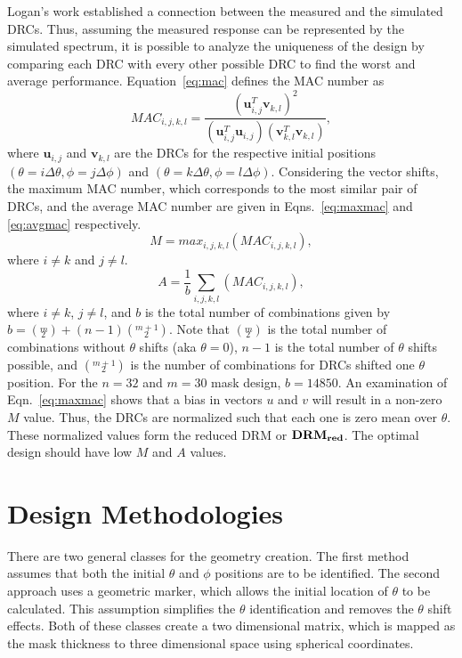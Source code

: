 \documentclass[3p,times]{elsarticle}
\begin{document}
Logan's work established a connection between the measured and the simulated DRCs.  Thus, assuming the measured response can be represented by the simulated spectrum,
it is possible to analyze the uniqueness of the design by comparing each DRC with every other possible DRC to find the worst and average performance.  Equation~\ref{eq:mac} defines the MAC number as
\begin{equation}
MAC_{i,j,k,l}=\frac{\left(\mathbf{u}_{i,j}^T\mathbf{v}_{k,l}\right)^2}{\left(\mathbf{u}_{i,j}^T\mathbf{u}_{i,j}\right)\left(\mathbf{v}_{k,l}^T\mathbf{v}_{k,l}\right)},
\label{eq:mac}
\end{equation}
where $\mathbf{u}_{i,j}$ and $\mathbf{v}_{k,l}$ are the DRCs for the respective initial positions $\left(\theta=i\Delta\theta,\phi=j\Delta\phi\right)$ and
$\left(\theta=k\Delta\theta,\phi=l\Delta\phi\right)$.
Considering the vector shifts, the maximum MAC number, which corresponds to the most similar pair of DRCs, and the average MAC number are given in 
Eqns.~\ref{eq:maxmac} and \ref{eq:avgmac} respectively.
\begin{equation}
M=max_{i,j,k,l}\left(MAC_{i,j,k,l}\right),
\label{eq:maxmac}
\end{equation}
where $i\neq k$ and $j\neq l$.
\begin{equation}
A=\frac{1}{b}\sum_{i,j,k,l}\left(MAC_{i,j,k,l}\right),
\label{eq:avgmac}
\end{equation}
where $i\neq k$, $j\neq l$, and $b$ is the total number of combinations given by $b=\left(\overset{m}{_2}\right)+(n-1)\left(\overset{m+1}{_2}\right)$.  
Note that $\left(\overset{m}{_2}\right)$ is the total number of combinations
without $\theta$ shifts (aka $\theta=0$), $n-1$ is the total number of $\theta$ shifts possible, and $\left(\overset{m+1}{_2}\right)$ is the number of combinations for DRCs shifted one $\theta$ 
position.  For the $n=32$ and
$m=30$ mask design, $b=14850$.  An examination of Eqn.~\ref{eq:maxmac} shows that a bias in vectors $u$ and $v$ will result in a non-zero $M$ value.  Thus, the DRCs are normalized such that each one is 
zero mean over $\theta$.  These normalized values form the reduced DRM or $\bf{DRM_{red}}$.  The optimal design should have low $M$ and $A$ values.

\section{Design Methodologies}
There are two general classes for the geometry creation.  The first method assumes that both the initial $\theta$ and $\phi$ positions are to be identified.  The second approach uses a geometric marker,
 which allows the initial location of $\theta$ to be calculated.  This assumption simplifies the $\theta$ identification and removes the $\theta$ shift effects.  Both of these classes create
 a two dimensional matrix, which is mapped as the mask thickness to three dimensional space using spherical coordinates.
\end{document}
